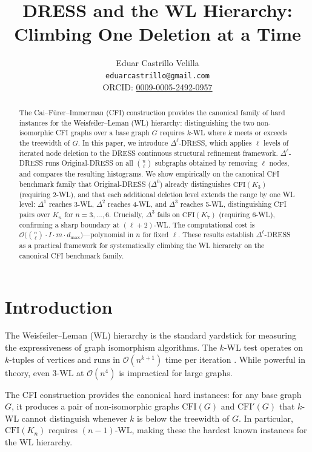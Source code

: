 \documentclass[11pt,a4paper]{article}
\title{DRESS and the WL Hierarchy: Climbing One Deletion at a Time}
\author{Eduar Castrillo Velilla \\ \texttt{eduarcastrillo@gmail.com} \\ ORCID: \href{https://orcid.org/0009-0005-2492-0957}{0009-0005-2492-0957}}
\date{}
\begin{document}
\maketitle

\begin{abstract}
The Cai--F\"urer--Immerman (CFI) construction provides the canonical family of hard instances for the Weisfeiler--Leman (WL) hierarchy: distinguishing the two non-isomorphic CFI graphs over a base graph $G$ requires $k$-WL where $k$ meets or exceeds the treewidth of $G$. In this paper, we introduce $\Delta^\ell$-DRESS, which applies $\ell$ levels of iterated node deletion to the DRESS continuous structural refinement framework. $\Delta^\ell$-DRESS runs Original-DRESS on all $\binom{n}{\ell}$ subgraphs obtained by removing $\ell$ nodes, and compares the resulting histograms. We show empirically on the canonical CFI benchmark family that Original-DRESS ($\Delta^0$) already distinguishes $\text{CFI}(K_3)$ (requiring 2-WL), and that each additional deletion level extends the range by one WL level: $\Delta^1$ reaches 3-WL, $\Delta^2$ reaches 4-WL, and $\Delta^3$ reaches 5-WL, distinguishing CFI pairs over $K_n$ for $n = 3, \ldots, 6$. Crucially, $\Delta^3$ fails on $\text{CFI}(K_7)$ (requiring 6-WL), confirming a sharp boundary at $(\ell+2)$-WL. The computational cost is $\mathcal{O}\bigl(\binom{n}{\ell} \cdot I \cdot m \cdot d_{\max}\bigr)$---polynomial in $n$ for fixed $\ell$. These results establish $\Delta^\ell$-DRESS as a practical framework for systematically climbing the WL hierarchy on the canonical CFI benchmark family.
\end{abstract}

\section{Introduction}

The Weisfeiler--Leman (WL) hierarchy \cite{weisfeiler1968reduction} is the standard yardstick for measuring the expressiveness of graph isomorphism algorithms. The $k$-WL test operates on $k$-tuples of vertices and runs in $\mathcal{O}(n^{k+1})$ time per iteration \cite{cai1992optimal}. While powerful in theory, even 3-WL at $\mathcal{O}(n^4)$ is impractical for large graphs.

The CFI construction \cite{cai1992optimal} provides the canonical hard instances: for any base graph $G$, it produces a pair of non-isomorphic graphs $\text{CFI}(G)$ and $\text{CFI}'(G)$ that $k$-WL cannot distinguish whenever $k$ is below the treewidth of $G$. In particular, $\text{CFI}(K_n)$ requires $(n{-}1)$-WL, making these the hardest known instances for the WL hierarchy.
\end{document}
